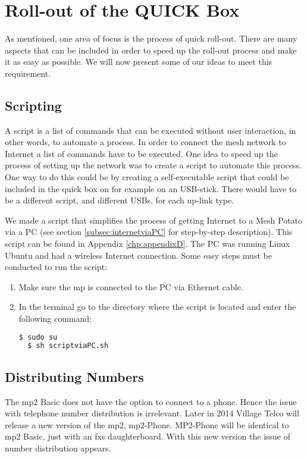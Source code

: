 \chapter{Roll-out of the QUICK Box}
\label{chp:manuals} 

As mentioned, one area of focus is the process of quick roll-out. There are many aspects that can be included in order to speed up the roll-out process and make it as easy as possible. We will now present some of our ideas to meet this requirement.


\section{Scripting}
A script is a list of commands that can be executed without user interaction, in other words, to automate a process. In order to connect the mesh network to Internet a list of commands have to be executed. One idea to speed up the process of setting up the network was to create a script to automate this process. One way to do this could be by creating a self-executable script that could be included in the \gls{quick} box on for example on an USB-stick. There would have to be a different script, and different USBs, for each up-link type. 

We made a script that simplifies the process of getting Internet to a Mesh Potato via a PC (see section \ref{subsec:internetviaPC} for step-by-step description). This script can be found in Appendix \ref{chp:appendixD}. The PC was running Linux Ubuntu and had a wireless Internet connection. Some easy steps must be conducted to run the script:
\begin{enumerate}
\item Make sure the \gls{mp} is connected to the PC via Ethernet cable.
\item In the terminal go to the directory where the script is located and enter the following command:
\noindent
\begin{lstlisting}[language=bash]
  $ sudo su
  $ sh scriptviaPC.sh
\end{lstlisting}
\end{enumerate}

\section{Distributing Numbers}
The \gls{mp2} Basic does not have the option to connect to a phone. Hence the issue with telephone number distribution is irrelevant. Later in 2014 Village Telco will release a new version of the \gls{mp2}, \gls{mp2}-Phone. MP2-Phone will be identical to \gls{mp2} Basic, just with an \gls{fxs} daughterboard. With this new version the issue of number distribution appears. 

